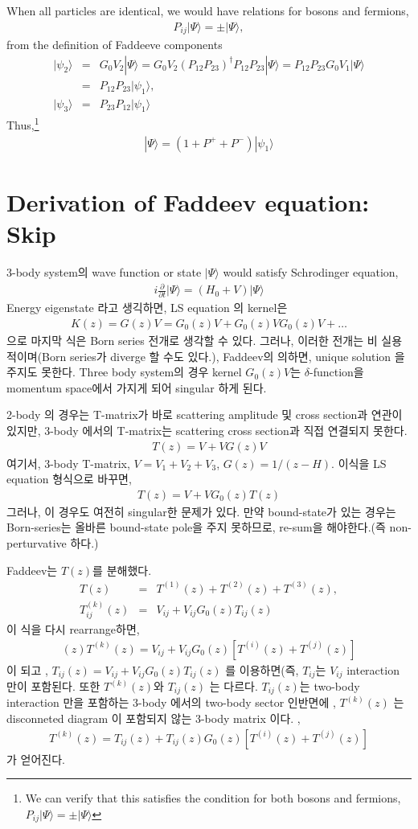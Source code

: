 \documentclass[11pt]{article}
\newcommand{\bea}{\begin{eqnarray}}
\newcommand{\eea}{\end{eqnarray}}
\newcommand{\no}{\nonumber \\}
\newcommand{\del}{\partial}
\newcommand{\ra}{\rangle}
\begin{document}
When all particles are identical, we would have relations for bosons and fermions,
\bea 
P_{ij}|\Psi\ra =\pm |\Psi\ra, 
\eea 
from the definition of Faddeeve components
\bea 
|\psi_2\ra&=&G_0 V_2|\Psi\ra =G_0 V_2 (P_{12}P_{23})^\dagger P_{12}P_{23}|\Psi\ra 
             =P_{12}P_{23} G_0 V_1|\Psi\ra \no 
          &=& P_{12}P_{23}|\psi_1\ra , \no 
|\psi_3\ra&=&P_{23}P_{12}|\psi_1\ra   
\eea 
Thus,\footnote{We can verify that this satisfies the 
condition for both bosons and fermions, $P_{ij}|\Psi\ra =\pm |\Psi\ra$} 
\bea 
|\Psi\ra =(1+P^++P^{-})|\psi_1\ra 
\eea 


\section{Derivation of Faddeev equation: Skip}
3-body system의 wave function or state $|\Psi\ra$ would satisfy Schrodinger equation,
\bea
i\frac{\del}{\del t} |\Psi\ra=(H_0+V)|\Psi\ra
\eea
Energy eigenstate 라고 생긱하면, LS equation 의 kernel은 
\bea
K(z)=G(z)V=G_0(z)V+G_0(z)VG_0(z)V+\dots
\eea
으로 마지막 식은 Born series 전개로 생각할 수 있다. 그러나, 이러한 전개는 
비 실용적이며(Born series가 diverge 할 수도 있다.),
 Faddeev의 의하면, unique solution 을 주지도 못한다. Three body system의 경우 
kernel $G_0(z)V$는 $\delta$-function을 momentum space에서 가지게 되어 singular
하게 된다.

2-body 의 경우는 T-matrix가 바로 scattering amplitude 및 cross section과 연관이 있지만, 
3-body 에서의  T-matrix는 scattering cross section과 직접 연결되지 못한다.
\bea
T(z)=V+VG(z)V
\eea
여기서, 3-body T-matrix, $V=V_1+V_2+V_3$, $G(z)=1/(z-H)$.  이식을 LS equation 형식으로 바꾸면,
\bea
T(z)=V+VG_0(z)T(z)
\eea
그러나, 이 경우도 여전히 singular한 문제가 있다. 만약 bound-state가 있는 경우는 Born-series는 
올바른 bound-state pole을 주지 못하므로, re-sum을 해야한다.(즉 non-perturvative 하다.)

Faddeev는 $T(z)$를 분해했다.
\bea
T(z)&=&T^{(1)}(z)+T^{(2)}(z)+T^{(3)}(z),\no 
T^{(k)}_{ij}(z)&=&V_{ij}+V_{ij}G_0(z)T_{ij}(z)
\eea
이 식을 다시 rearrange하면, 
\bea
[1-V_{ij}G_0](z)T^{(k)}(z)=V_{ij}+V_{ij}G_0(z)[T^{(i)}(z)+T^{(j)}(z)]
\eea 
이 되고 , $T_{ij}(z)=V_{ij}+V_{ij}G_0(z) T_{ij}(z)$ 를 이용하면(즉,
$T_{ij}$는 $V_{ij}$ interaction 만이 포함된다. 또한 $T^{(k)}(z)$와 
$T_{ij}(z)$ 는 다르다. $T_{ij}(z)$는 two-body interaction 만을  포함하는 
3-body 에서의 two-body sector 인반면에 , $T^{(k)}(z)$ 는 disconneted diagram
이 포함되지 않는  3-body matrix 이다.
,
\bea
T^{(k)}(z)=T_{ij}(z)+T_{ij}(z)G_0(z)[T^{(i)}(z)+T^{(j)}(z)]
\eea
가 얻어진다.
\end{document}
